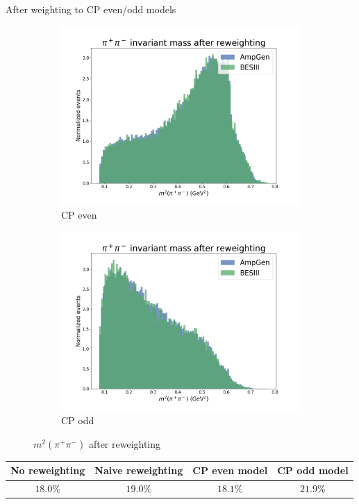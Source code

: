 \documentclass{beamer}
\begin{document}
\begin{frame}{After weighting to CP even/odd models}
  \begin{figure}
    \begin{subfigure}{0.50\textwidth}
      \includegraphics[width = 1.0\textwidth]{Plots/s23_AfterReweighting_CPEven.png}
      \caption{CP even}
    \end{subfigure}%
    \begin{subfigure}{0.50\textwidth}
      \includegraphics[width = 1.0\textwidth]{Plots/s23_AfterReweighting_CPOdd.png}
      \caption{CP odd}
    \end{subfigure}
    \caption{$m^2(\pi^+\pi^-)$ after reweighting}
  \end{figure}
  \vspace{-0.4cm}
  \begin{tabular}{cccc}
    \hline
    No reweighting & Naive reweighting & CP even model & CP odd model \\
    \hline
    $18.0\%$       & $19.0\%$          & $18.1\%$      & $21.9\%$ \\
    \hline
  \end{tabular}
\end{frame}
\end{document}

